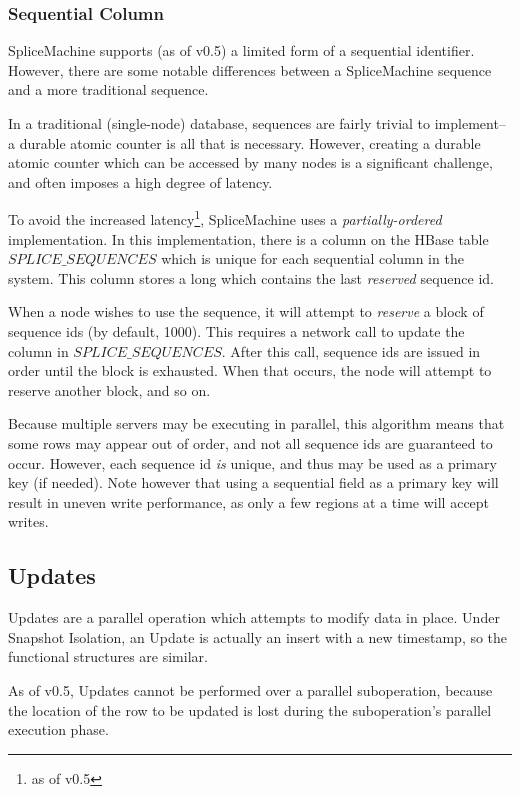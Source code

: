 \subsubsection{Sequential Column}
SpliceMachine supports (as of v0.5) a limited form of a sequential identifier. However, there are some notable differences between a SpliceMachine sequence and a more traditional sequence.

In a traditional (single-node) database, sequences are fairly trivial to implement-- a durable atomic counter is all that is necessary. However, creating a durable atomic counter which can be accessed by many nodes is a significant challenge, and often imposes a high degree of latency.

To avoid the increased latency\footnote{as of v0.5}, SpliceMachine uses a \emph{partially-ordered} implementation. In this implementation, there is a column on the HBase table $SPLICE\_SEQUENCES$ which is unique for each sequential column in the system. This column stores a long which contains the last \emph{reserved} sequence id.

When a node wishes to use the sequence, it will attempt to \emph{reserve} a block of sequence ids (by default, 1000). This requires a network call to update the column in $SPLICE\_SEQUENCES$. After this call, sequence ids are issued in order until the block is exhausted. When that occurs, the node will attempt to reserve another block, and so on.

Because multiple servers may be executing in parallel, this algorithm means that some rows may appear out of order, and not all sequence ids are guaranteed to occur. However, each sequence id \emph{is} unique, and thus may be used as a primary key (if needed). Note however that using a sequential field as a primary key will result in uneven write performance, as only a few regions at a time will accept writes.

\subsection{Updates}

Updates are a parallel operation which attempts to modify data in place. Under Snapshot Isolation, an Update is actually an insert with a new timestamp, so the functional structures are similar.

As of v0.5, Updates cannot be performed over a parallel suboperation, because the location of the row to be updated is lost during the suboperation's parallel execution phase.

